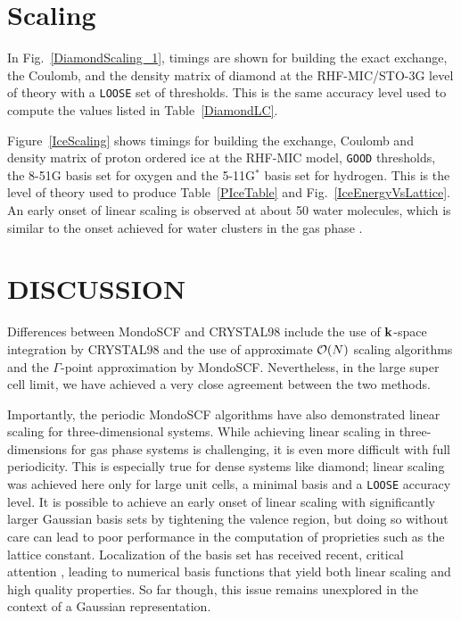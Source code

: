 \commentoutA{\documentclass[prb,aps,nobibnotes,twocolumn,doublespace,twocolumngrid,superbib,showpacs]{revtex4}}
\begin{document}
\section{Scaling}\label{scaling}

In Fig.~\ref{DiamondScaling_1}, timings are shown for building the exact exchange, the Coulomb, 
and the density matrix of diamond at the RHF-MIC/STO-3G level of theory with  a {\tt LOOSE} 
set of thresholds.  This is the same accuracy level used to compute the values listed in Table~\ref{DiamondLC}.

Figure~\ref{IceScaling} shows timings for building the  exchange, Coulomb and density matrix
of proton ordered ice \cite{SCasassa97} at the RHF-MIC model, {\tt GOOD} thresholds, the 8-51G basis 
set for oxygen and the 5-11G$^*$ basis set for hydrogen.  This is the level of theory used to
produce Table~\ref{PIceTable} and Fig.~\ref{IceEnergyVsLattice}.  An early onset of linear scaling 
is observed at about 50 water molecules, which is similar to the onset achieved for water clusters 
in the gas phase \cite{ANiklasson03}.

\section{DISCUSSION}\label{discussion}


Differences between {\sc MondoSCF} and {\sc CRYSTAL98} include the use of ${\bf k}$-space 
integration by {\sc CRYSTAL98} and the use of approximate ${\cal O}(N)$ scaling algorithms and the  
$\Gamma$-point approximation by {\sc MondoSCF}.  Nevertheless, in the large super cell limit, we have achieved a 
very close agreement between the two methods.   

Importantly, the periodic {\sc MondoSCF} algorithms have also 
demonstrated linear scaling for three-dimensional systems.  While 
achieving linear scaling in three-dimensions for gas phase systems is challenging, 
it is even more difficult with full periodicity.  This is especially true for
dense systems like diamond;  linear scaling was achieved here only for large unit cells, 
a minimal basis and a {\tt LOOSE} accuracy level.  It is possible to achieve
an early onset of linear scaling with significantly larger Gaussian basis sets by 
tightening the valence region, but doing so without care can lead to  poor 
performance in the computation of proprieties such as the lattice constant.  
Localization of the  basis set  has received recent, critical attention \cite{SKenny00,JJunquera01,EAnglada02},
leading to numerical  basis functions that yield both linear scaling and high quality properties.  So far though,
this issue remains unexplored in the context of a Gaussian representation.
\end{document}
